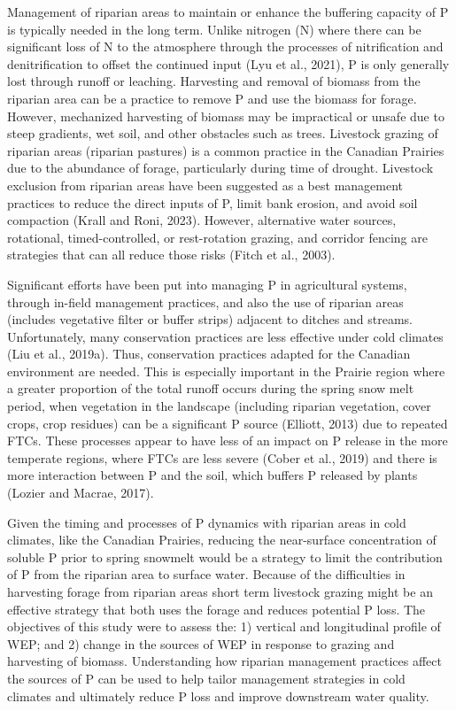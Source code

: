 \documentclass[
]{agujournal2019}
\begin{document}
Management of riparian areas to maintain or enhance the buffering
capacity of P is typically needed in the long term. Unlike nitrogen (N)
where there can be significant loss of N to the atmosphere through the
processes of nitrification and denitrification to offset the continued
input (Lyu et al., 2021), P is only generally lost through runoff or
leaching. Harvesting and removal of biomass from the riparian area can
be a practice to remove P and use the biomass for forage. However,
mechanized harvesting of biomass may be impractical or unsafe due to
steep gradients, wet soil, and other obstacles such as trees. Livestock
grazing of riparian areas (riparian pastures) is a common practice in
the Canadian Prairies due to the abundance of forage, particularly
during time of drought. Livestock exclusion from riparian areas have
been suggested as a best management practices to reduce the direct
inputs of P, limit bank erosion, and avoid soil compaction (Krall and
Roni, 2023). However, alternative water sources, rotational,
timed-controlled, or rest-rotation grazing, and corridor fencing are
strategies that can all reduce those risks (Fitch et al., 2003).

Significant efforts have been put into managing P in agricultural
systems, through in-field management practices, and also the use of
riparian areas (includes vegetative filter or buffer strips) adjacent to
ditches and streams. Unfortunately, many conservation practices are less
effective under cold climates (Liu et al., 2019a). Thus, conservation
practices adapted for the Canadian environment are needed. This is
especially important in the Prairie region where a greater proportion of
the total runoff occurs during the spring snow melt period, when
vegetation in the landscape (including riparian vegetation, cover crops,
crop residues) can be a significant P source (Elliott, 2013) due to
repeated FTCs. These processes appear to have less of an impact on P
release in the more temperate regions, where FTCs are less severe (Cober
et al., 2019) and there is more interaction between P and the soil,
which buffers P released by plants (Lozier and Macrae, 2017).

Given the timing and processes of P dynamics with riparian areas in cold
climates, like the Canadian Prairies, reducing the near-surface
concentration of soluble P prior to spring snowmelt would be a strategy
to limit the contribution of P from the riparian area to surface water.
Because of the difficulties in harvesting forage from riparian areas
short term livestock grazing might be an effective strategy that both
uses the forage and reduces potential P loss. The objectives of this
study were to assess the: 1) vertical and longitudinal profile of WEP;
and 2) change in the sources of WEP in response to grazing and
harvesting of biomass. Understanding how riparian management practices
affect the sources of P can be used to help tailor management strategies
in cold climates and ultimately reduce P loss and improve downstream
water quality.
\end{document}

